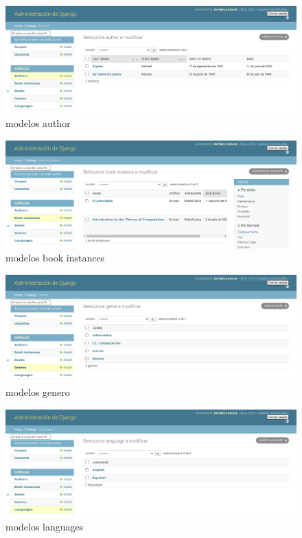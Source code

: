 \documentclass{article}
\begin{document}
\begin{figure}[H]
    \centering
    \includegraphics[scale=0.3]{img/exe/modelo author.png}
    \caption{modelos author}
\end{figure}
\begin{figure}[H]
    \centering
    \includegraphics[scale=0.3]{img/exe/modelo book instances.png}
    \caption{modelos book instances}
\end{figure}
\begin{figure}[H]
    \centering
    \includegraphics[scale=0.3]{img/exe/modelo Genres.png}
    \caption{modelos genero}
\end{figure}
\begin{figure}[H]
    \centering
    \includegraphics[scale=0.3]{img/exe/modelo languages.png}
    \caption{modelos languages}
\end{figure}
\end{document}
